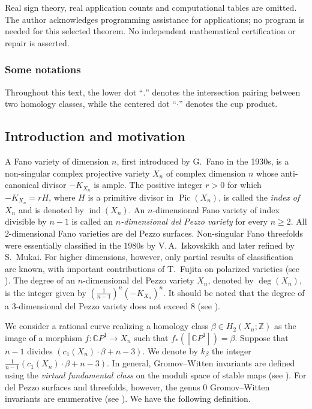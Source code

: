 \documentclass[10pt,a4paper]{article}
\numberwithin{equation}{section}
\theoremstyle{definition}
\theoremstyle{plain}
\theoremstyle{remark}
\newcommand{\Z}{\mathbb{Z}}
\DeclareMathOperator{\ind}{ind}
\DeclareMathOperator{\Pic}{Pic}
\begin{document}
\par\noindent Real sign theory, real application counts and computational tables are omitted. The author acknowledges programming assistance for applications; no program is needed for this selected theorem. No independent mathematical certification or repair is asserted.

\setcounter{section}{1}\setcounter{subsection}{0}\setcounter{definition}{0}

\subsubsection*{Some notations}
Throughout this text, the lower dot ``$.$'' denotes the intersection pairing between two homology classes, while the centered dot ``$\cdot$'' denotes the cup product.

\subsection{Introduction and motivation}
A Fano variety of dimension $n$, first introduced by G.~Fano in the 1930s, is a non-singular complex projective variety $X_n$ of complex dimension $n$ whose anti-canonical divisor $-K_{X_n}$ is ample. The positive integer $r>0$ for which $-K_{X_n}=rH$, where $H$ is a primitive divisor in $\Pic(X_n)$, is called the \textit{index of\, $X_n$} and is denoted by $\ind(X_n)$. An $n$-dimensional Fano variety of index divisible by $n-1$ is called an \textit{$n$-dimensional del Pezzo variety} for every $n\geq 2$. All $2$-dimensional Fano varieties are del Pezzo surfaces.  Non-singular Fano threefolds were essentially classified in the 1980s by V.\,A.~Iskovskikh and later refined by S.~Mukai. For higher dimensions, however, only partial results of classification are known, with important contributions of T.~Fujita on polarized varieties (see 
 \cite{iskovskikh2010algebraic}). The degree of an $n$-dimensional del Pezzo variety $X_n$, denoted by $\deg(X_n)$, is the integer given by $(\frac{1}{n-1})^n(-K_{X_n})^n$. It should be noted that the degree of a $3$-dimensional del Pezzo variety does not exceed $8$  (see \cite[Chapters~2 and~3]{iskovskikh2010algebraic}).
 

We consider a rational curve realizing a homology class $\beta\in H_2(X_n;\Z)$ as the image of a morphism $f\colon \mathbb{C}P^1\rightarrow X_n$ such that $f_*([\mathbb{C}P^1])=\beta$. Suppose that $n-1$ divides $\left(c_1(X_n)\cdot\beta+n-3\right)$. We denote by $k_\beta$ the integer $\frac{1}{n-1} \left(c_1(X_n)\cdot\beta+n-3\right)$. In general, Gromov--Witten invariants are defined using the \emph{virtual fundamental class} on the moduli space of stable maps (see \cite{KontsevichManin}). For del Pezzo surfaces and threefolds, however, the genus $0$ Gromov--Witten invariants are enumerative (see \cite{Vakil,Coskun,iskovskikh2010algebraic}). We have the following definition.
\end{document}
